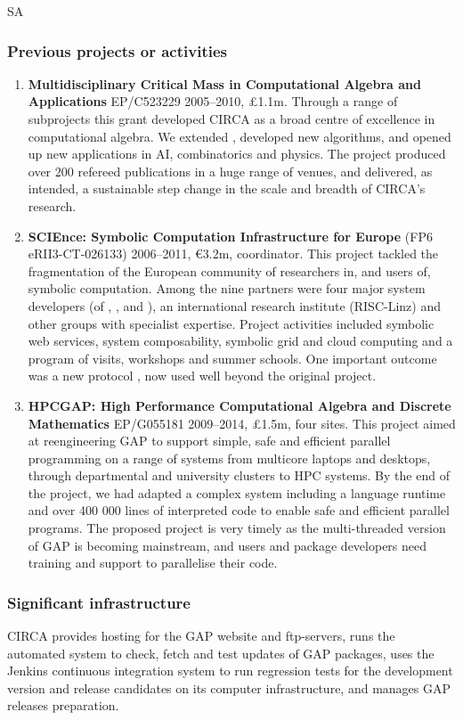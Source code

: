 \begin{sitedescription}{SA}
\subsubsection*{Previous projects or activities}

\begin{enumerate}
\item
\textbf{Multidisciplinary Critical Mass in Computational
Algebra and Applications} EP/C523229 2005--2010, \pounds 1.1m.
Through a range of subprojects this grant developed CIRCA as 
a broad centre of excellence in computational algebra. We 
extended \GAP, developed new algorithms, and opened up new 
applications in AI, combinatorics and physics. The project 
produced over 200 refereed publications in a huge range of 
venues, and delivered, as intended, a sustainable step change 
in the scale and breadth of CIRCA's research.
\item 
\textbf{SCIEnce: Symbolic Computation Infrastructure for Europe}
(FP6 eRII3-CT-026133) 2006--2011, \euro 3.2m, coordinator.
This project tackled the fragmentation of the European community 
of researchers in, and users of, symbolic computation. Among the 
nine partners were four major system developers (of \GAP, \Maple, 
\MuPAD and \KANT), an international research institute (RISC-Linz) 
and other groups with specialist expertise. Project activities 
included symbolic web services, system composability, symbolic 
grid and cloud computing and a program of visits, workshops and 
summer schools. One important outcome was a new protocol \SCSCP, 
now used well beyond the original project.
\item
\textbf{HPCGAP: High Performance Computational Algebra and Discrete Mathematics} 
EP/G055181 2009--2014, \pounds 1.5m, four sites. This project aimed
at reengineering GAP to support simple, safe and efficient parallel 
programming on a range of systems from multicore laptops and desktops, 
through departmental and university clusters to HPC systems. By the 
end of the project, we had adapted a complex system including a 
language runtime and over 400 000 lines of interpreted code to enable 
safe and efficient parallel programs. The proposed project is very timely as
the multi-threaded version of GAP is becoming mainstream, and users and 
package developers need training and support to parallelise their code.
\end{enumerate}

\subsubsection*{Significant infrastructure}

CIRCA provides hosting for the GAP website and ftp-servers, runs the 
automated system to check, fetch and test updates of GAP packages, uses 
the Jenkins continuous integration system to run regression tests for the 
development version and release candidates on its computer infrastructure, 
and manages GAP releases preparation.
\end{sitedescription}


